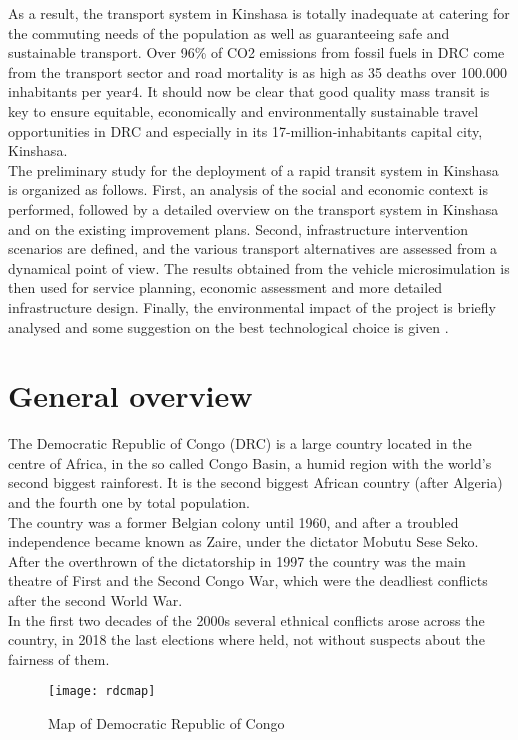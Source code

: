 \documentclass{article}
\begin{document}
As a result, the transport system in Kinshasa is totally inadequate at catering for the commuting needs of the population as well as guaranteeing safe and sustainable transport. Over 96\% of CO2 emissions from fossil fuels in DRC come from the transport sector and road mortality is as high as 35 deaths over 100.000 inhabitants per year4. It should now be clear that good quality mass transit is key to ensure equitable, economically and environmentally sustainable travel opportunities in DRC and especially in its 17-million-inhabitants capital city, Kinshasa.\\
The preliminary study for the deployment of a rapid transit system in Kinshasa is organized as follows. First, an analysis of the social and economic context is performed, followed by a detailed overview on the transport system in Kinshasa and on the existing improvement plans. Second, infrastructure intervention scenarios are defined, and the various transport alternatives are assessed from a dynamical point of view. The results obtained from the vehicle microsimulation is then used for service planning, economic assessment and more detailed infrastructure design. Finally, the environmental impact of the project is briefly analysed and some suggestion on the best technological choice is given \cite{worldbank1}.
\newpage
\section{General overview}
The Democratic Republic of Congo (DRC) is a large country located in the centre of Africa, in the so called Congo Basin, a humid region with the world's second biggest rainforest. It is the second biggest African country (after Algeria) and the fourth one by total population.\\
The country was a former Belgian colony until 1960, and after a troubled independence became known as Zaire, under the dictator Mobutu Sese Seko. After the overthrown of the dictatorship in 1997 the country was the main theatre of First and the Second Congo War, which were the deadliest conflicts after the second World War.\\
In the first two decades of the 2000s several ethnical conflicts arose across the country, in 2018 the last elections where held, not without suspects about the fairness of them.

\begin{figure}[H]
\centering
\texttt{[image: rdcmap]}
\caption{Map of Democratic Republic of Congo}
\end{figure}
\end{document}
